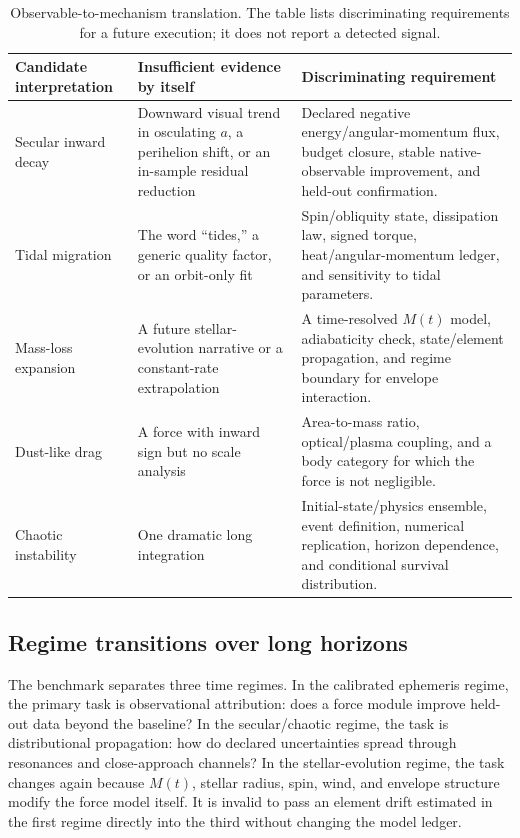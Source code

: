 \documentclass[10pt,conference]{IEEEtran}
\begin{document}
\begin{table}[!t]
\caption{Observable-to-mechanism translation. The table lists discriminating requirements for a future execution; it does not report a detected signal.}
\label{tab:identifiability}
\centering
\footnotesize
\setlength{\tabcolsep}{2.5pt}
\begin{tabular}{p{}p{}p{}}
\toprule
Candidate interpretation & Insufficient evidence by itself & Discriminating requirement \\
\midrule
Secular inward decay & Downward visual trend in osculating $a$, a perihelion shift, or an in-sample residual reduction & Declared negative energy/angular-momentum flux, budget closure, stable native-observable improvement, and held-out confirmation. \\
Tidal migration & The word ``tides,'' a generic quality factor, or an orbit-only fit & Spin/obliquity state, dissipation law, signed torque, heat/angular-momentum ledger, and sensitivity to tidal parameters. \\
Mass-loss expansion & A future stellar-evolution narrative or a constant-rate extrapolation & A time-resolved $M(t)$ model, adiabaticity check, state/element propagation, and regime boundary for envelope interaction. \\
Dust-like drag & A force with inward sign but no scale analysis & Area-to-mass ratio, optical/plasma coupling, and a body category for which the force is not negligible. \\
Chaotic instability & One dramatic long integration & Initial-state/physics ensemble, event definition, numerical replication, horizon dependence, and conditional survival distribution. \\
\bottomrule
\end{tabular}
\end{table}

\subsection{Regime transitions over long horizons}

The benchmark separates three time regimes. In the calibrated ephemeris regime, the primary task is observational attribution: does a force module improve held-out data beyond the baseline? In the secular/chaotic regime, the task is distributional propagation: how do declared uncertainties spread through resonances and close-approach channels? In the stellar-evolution regime, the task changes again because $M(t)$, stellar radius, spin, wind, and envelope structure modify the force model itself. It is invalid to pass an element drift estimated in the first regime directly into the third without changing the model ledger.
\end{document}
